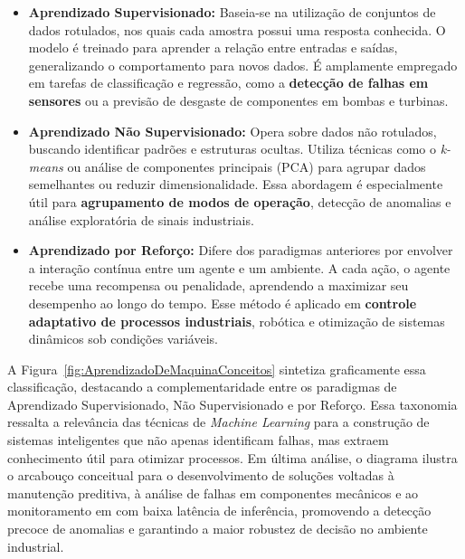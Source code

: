 \begin{itemize}
    \item \textbf{Aprendizado Supervisionado:} Baseia-se na utilização de conjuntos de dados rotulados, nos quais cada amostra possui uma resposta conhecida. O modelo é treinado para aprender a relação entre entradas e saídas, generalizando o comportamento para novos dados. É amplamente empregado em tarefas de classificação e regressão, como a \textbf{detecção de falhas em sensores} ou a previsão de desgaste de componentes em bombas e turbinas.

    \item \textbf{Aprendizado Não Supervisionado:} Opera sobre dados não rotulados, buscando identificar padrões e estruturas ocultas. Utiliza técnicas como o \textit{k-means} ou análise de componentes principais (PCA) para agrupar dados semelhantes ou reduzir dimensionalidade. Essa abordagem é especialmente útil para \textbf{agrupamento de modos de operação}, detecção de anomalias e análise exploratória de sinais industriais.

    \item \textbf{Aprendizado por Reforço:} Difere dos paradigmas anteriores por envolver a interação contínua entre um agente e um ambiente. A cada ação, o agente recebe uma recompensa ou penalidade, aprendendo a maximizar seu desempenho ao longo do tempo. Esse método é aplicado em \textbf{controle adaptativo de processos industriais}, robótica e otimização de sistemas dinâmicos sob condições variáveis.
\end{itemize}

A Figura~\ref{fig:AprendizadoDeMaquinaConceitos} sintetiza graficamente essa classificação, destacando a complementaridade entre os paradigmas de Aprendizado Supervisionado, Não Supervisionado e por Reforço. Essa taxonomia ressalta a relevância das técnicas de \textit{Machine Learning} para a construção de sistemas inteligentes que não apenas identificam falhas, mas extraem conhecimento útil para otimizar processos. Em última análise, o diagrama ilustra o arcabouço conceitual para o desenvolvimento de soluções voltadas à manutenção preditiva, à análise de falhas em componentes mecânicos e ao monitoramento em  com baixa latência de inferência, promovendo a detecção precoce de anomalias e garantindo a maior robustez de decisão no ambiente industrial.

